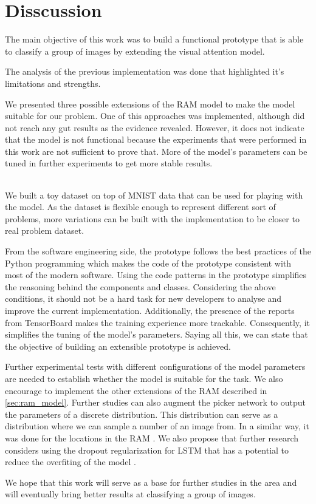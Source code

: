 \chapter{Disscussion}

The main objective of this work was to build a functional prototype that is able to
 classify a group of images by extending
the visual attention model.

The analysis of the previous implementation was done that highlighted it's
 limitations and strengths.

We presented three possible extensions of the RAM model to make the model
 suitable for our problem. One of this approaches was implemented, although
  did not reach any gut results
as the evidence revealed. However, it does not indicate that the model is
 not functional because the experiments that were performed in this work are
  not sufficient to prove that.
  More of the model's parameters can be tuned in further experiments
   to get more stable results.
\subparagraph{}
We built a toy dataset on top of MNIST data that can be used for playing
with the model.
As the dataset is flexible enough to represent different sort of
problems, more variations can be built with the implementation
to be closer to real problem
dataset.

From the software engineering side, the prototype follows the best
practices of the Python programming which makes the code
of the prototype consistent with most of the modern software. Using
the code patterns in the prototype simplifies the reasoning behind the
components and classes.
Considering the above conditions, it should not be a hard task for
 new developers to analyse and improve the current implementation.
 Additionally, the presence of the reports from TensorBoard makes the training experience more trackable.
 Consequently, it simplifies the tuning of the model's parameters.
Saying all this, we can state that the objective of building an
extensible prototype is achieved.

Further experimental tests with different configurations of the model
 parameters are needed to establish whether the model is suitable for the task.
 We also encourage to implement the other extensions of the RAM
 described in \autoref{sec:ram_model}. Further studies can also augment the picker network
to output the parameters of a discrete distribution.
This distribution can serve as a distribution where
we can sample a number of an image from. In a  similar way,
it was done for the locations in the RAM \cite{DBLP:journals/corr/MnihHGK14}.
We also propose that further research considers using the dropout
regularization for LSTM that has a potential to reduce the overfiting
of the model \cite{DBLP:journals/corr/ZarembaSV14}.

We hope that this work will serve as a base for further studies in the
area and will eventually bring better results at classifying a group
of images.
